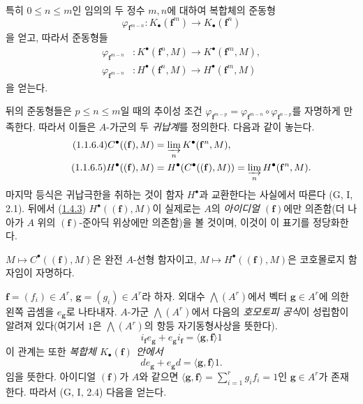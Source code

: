 \begin{env}[1.1.6]
\label{III.1.1.6-fr}
특히 $0\leq n\leq m$인 임의의 두 정수 $m,n$에 대하여 복합체의 준동형
\begin{equation}
\label{III.1.1.6.1-fr}
\tag{1.1.6.1}
\varphi_{\mathbf f^{m-n}}:K_\bullet(\mathbf f^m)\longrightarrow
K_\bullet(\mathbf f^n)
\end{equation}
을 얻고, 따라서 준동형들
\begin{align}
\label{III.1.1.6.2-fr}
\tag{1.1.6.2}
\varphi_{\mathbf f^{m-n}} &:K^\bullet(\mathbf f^n,M)\longrightarrow
K^\bullet(\mathbf f^m,M),\\
\label{III.1.1.6.3-fr}
\tag{1.1.6.3}
\varphi_{\mathbf f^{m-n}} &:H^\bullet(\mathbf f^n,M)\longrightarrow
H^\bullet(\mathbf f^m,M)
\end{align}
을 얻는다.

뒤의 준동형들은 $p\leq n\leq m$일 때의 추이성 조건
$\varphi_{\mathbf f^{m-p}}=
\varphi_{\mathbf f^{m-n}}\circ\varphi_{\mathbf f^{n-p}}$를 자명하게 만족한다.
따라서 이들은 $A$-가군의 두 \emph{귀납계}를 정의한다. 다음과 같이 놓는다.
\begin{align}
\label{III.1.1.6.4-fr}
\tag{1.1.6.4}
C^\bullet((\mathbf f),M)&=\varinjlim_n K^\bullet(\mathbf f^n,M),\\
\label{III.1.1.6.5-fr}
\tag{1.1.6.5}
H^\bullet((\mathbf f),M)&=H^\bullet(C^\bullet((\mathbf f),M))
=\varinjlim_n H^\bullet(\mathbf f^n,M).
\end{align}
마지막 등식은 귀납극한을 취하는 것이 함자 $H^\bullet$과 교환한다는 사실에서
따른다 (G, I, 2.1). 뒤에서 (\hyperref[III.1.4.3-fr]{1.4.3})
$H^\bullet((\mathbf f),M)$이 실제로는 $A$의 \emph{아이디얼
$(\mathbf f)$}에만 의존함(더 나아가 $A$ 위의 $(\mathbf f)$-준아딕 위상에만
의존함)을 볼 것이며, 이것이 이 표기를 정당화한다.

$M\mapsto C^\bullet((\mathbf f),M)$은 완전 $A$-선형 함자이고,
$M\mapsto H^\bullet((\mathbf f),M)$은 코호몰로지 함자임이 자명하다.
\end{env}

\begin{env}[1.1.7]
\label{III.1.1.7-fr}
$\mathbf f=(f_i)\in A^r$, $\mathbf g=(g_i)\in A^r$라 하자. 외대수
$\bigwedge(A^r)$에서 벡터 $\mathbf g\in A^r$에 의한 왼쪽 곱셈을
$e_{\mathbf g}$로 나타내자. $A$-가군 $\bigwedge(A^r)$에서 다음의
\emph{호모토피 공식}이 성립함이 알려져 있다(여기서 $1$은
$\bigwedge(A^r)$의 항등 자기동형사상을 뜻한다).
\begin{equation}
\label{III.1.1.7.1-fr}
\tag{1.1.7.1}
i_{\mathbf f}e_{\mathbf g}+e_{\mathbf g}i_{\mathbf f}
=\langle\mathbf g,\mathbf f\rangle 1
\end{equation}
이 관계는 또한 \emph{복합체 $K_\bullet(\mathbf f)$ 안에서}
\begin{equation}
\label{III.1.1.7.2-fr}
\tag{1.1.7.2}
de_{\mathbf g}+e_{\mathbf g}d=\langle\mathbf g,\mathbf f\rangle 1.
\end{equation}
임을 뜻한다. 아이디얼 $(\mathbf f)$가 $A$와 같으면
$\langle\mathbf g,\mathbf f\rangle=\sum_{i=1}^r g_if_i=1$인
$\mathbf g\in A^r$가 존재한다. 따라서 (G, I, 2.4) 다음을 얻는다.
\end{env}

